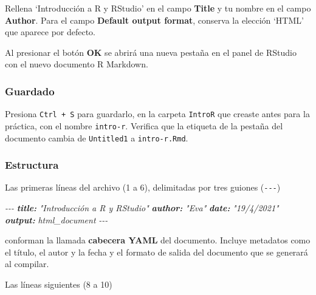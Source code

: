 \documentclass[
  title=normal,
  notoc,
  bib=normal]{mnye}
\newenvironment{Shaded}{\begin{snugshade}}{\end{snugshade}}
\newcommand{\AnnotationTok}[1]{\textcolor[rgb]{0.56,0.35,0.01}{\textbf{\textit{#1}}}}
\newcommand{\CommentTok}[1]{\textcolor[rgb]{0.56,0.35,0.01}{\textit{#1}}}
\newcommand{\InformationTok}[1]{\textcolor[rgb]{0.56,0.35,0.01}{\textbf{\textit{#1}}}}
\begin{document}
Rellena `Introducción a R y RStudio' en el campo \textbf{Title} y tu nombre en el campo \textbf{Author}. Para el campo \textbf{Default output format}, conserva la elección `HTML' que aparece por defecto.

Al presionar el botón \textbf{OK} se abrirá una nueva pestaña en el panel de \textsf{RStudio} con el nuevo documento R Markdown.

\hypertarget{guardado-1}{%
\subsubsection{Guardado}\label{guardado-1}}

Presiona \texttt{Ctrl\ +\ S} para guardarlo, en la carpeta \texttt{IntroR} que creaste antes para la práctica, con el nombre \texttt{intro-r}. Verifica que la etiqueta de la pestaña del documento cambia de \texttt{Untitled1} a \texttt{intro-r.Rmd}.

\hypertarget{estructura}{%
\subsubsection{Estructura}\label{estructura}}

Las primeras líneas del archivo (1 a 6), delimitadas por tres guiones (\texttt{-\/-\/-})

\begin{Shaded}
\begin{Highlighting}[]
\CommentTok{{-}{-}{-}}
\AnnotationTok{title:}\CommentTok{ "Introducción a R y RStudio"}
\AnnotationTok{author:}\CommentTok{ "Eva"}
\AnnotationTok{date:}\CommentTok{ "19/4/2021"}
\AnnotationTok{output:}\CommentTok{ html\_document}
\CommentTok{{-}{-}{-}}
\end{Highlighting}
\end{Shaded}

conforman la llamada \textbf{cabecera YAML} del documento. Incluye metadatos como el título, el autor y la fecha y el formato de salida del documento que se generará al compilar.

Las líneas siguientes (8 a 10)

\begin{Shaded}
\end{Shaded}
\end{document}
